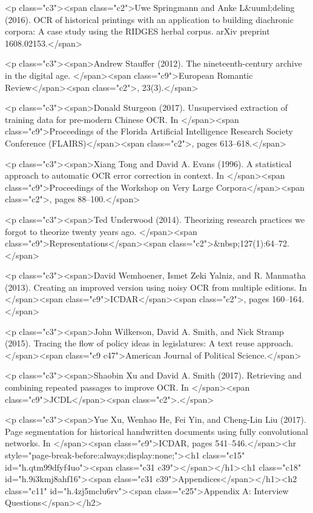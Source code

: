 \documentclass[twoside,11pt]{report}
\begin{document}
<p class="c3"><span class="c2">Uwe Springmann and Anke L&uuml;deling (2016). OCR of historical printings with an application to building diachronic corpora: A case study using the RIDGES herbal corpus. arXiv preprint 1608.02153.</span>

<p class="c3"><span>Andrew Stauffer (2012). The nineteenth-century archive in the digital age. </span><span class="c9">European Romantic Review</span><span class="c2">, 23(3).</span>

<p class="c3"><span>Donald Sturgeon (2017). Unsupervised extraction of training data for pre-modern Chinese OCR. In </span><span class="c9">Proceedings of the Florida Artificial Intelligence Research Society Conference (FLAIRS)</span><span class="c2">, pages 613--618.</span>

<p class="c3"><span>Xiang Tong and David A. Evans (1996). A statistical approach to automatic OCR error correction in context. In </span><span class="c9">Proceedings of the Workshop on Very Large Corpora</span><span class="c2">, pages 88--100.</span>

<p class="c3"><span>Ted Underwood (2014). Theorizing research practices we forgot to theorize twenty years ago. </span><span class="c9">Representations</span><span class="c2">&nbsp;127(1):64--72.</span>

<p class="c3"><span>David Wemhoener, Ismet Zeki Yalniz, and R. Manmatha (2013). Creating an improved version using noisy OCR from multiple editions. In </span><span class="c9">ICDAR</span><span class="c2">, pages 160--164.</span>

<p class="c3"><span>John Wilkerson, David A. Smith, and Nick Stramp (2015). Tracing the flow of policy ideas in legislatures: A text reuse approach. </span><span class="c9 c47">American Journal of Political Science.</span>

<p class="c3"><span>Shaobin Xu and David A. Smith (2017). Retrieving and combining repeated passages to improve OCR. In </span><span class="c9">JCDL</span><span class="c2">.</span>

<p class="c3"><span>Yue Xu, Wenhao He, Fei Yin, and Cheng-Lin Liu (2017). Page segmentation for historical handwritten documents using fully convolutional networks. In </span><span class="c9">ICDAR, pages 541--546.</span><hr style="page-break-before:always;display:none;"><h1 class="c15" id="h.qtm99dfyf4uo"><span class="c31 c39"></span></h1><h1 class="c18" id="h.9i3kmj8ahf16"><span class="c31 c39">Appendices</span></h1><h2 class="c11" id="h.4zj5mclu6rv"><span class="c25">Appendix A: Interview Questions</span></h2>
\end{document}

